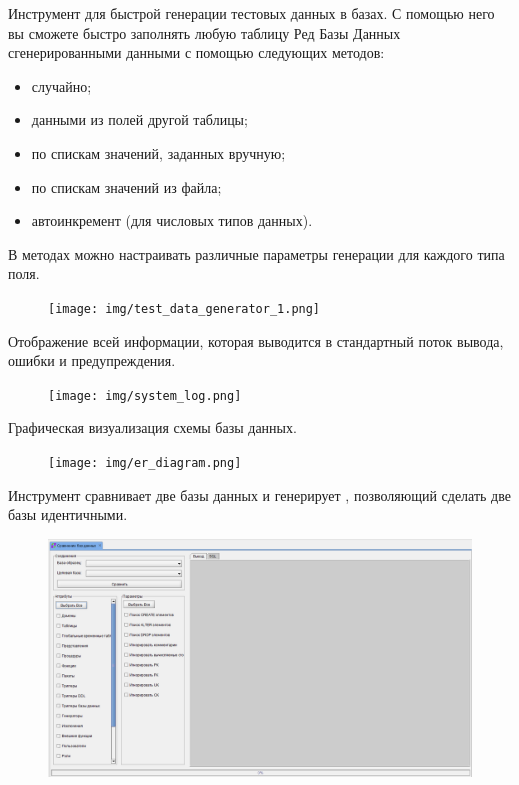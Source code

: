 
Инструмент для быстрой генерации тестовых данных в базах.  С помощью него вы сможете быстро заполнять любую таблицу Ред Базы Данных сгенерированными данными с помощью следующих методов:
\begin{itemize}
	\item случайно;
	\item данными из полей другой таблицы;
	\item по спискам значений, заданных вручную;
	\item по спискам значений из файла;
	\item автоинкремент (для числовых типов данных).
\end{itemize}
В методах можно настраивать различные параметры генерации для каждого типа поля. 

\begin{figure}[H]
	\centering
	\texttt{[image: img/test\_data\_generator\_1.png]}
\end{figure}


Отображение всей информации, которая выводится в стандартный поток вывода, ошибки и предупреждения.
	\begin{figure}[H]
		\centering
		\texttt{[image: img/system\_log.png]}
	\end{figure}


Графическая визуализация схемы базы данных.
	\begin{figure}[H]
		\centering
		\texttt{[image: img/er\_diagram.png]}
	\end{figure}


Инструмент сравнивает две базы данных и генерирует , позволяющий сделать две базы идентичными. 

\begin{figure}[H]
	\centering
	\includegraphics[width = 0.8\linewidth]{img/compareDB_module.png}
\end{figure}

